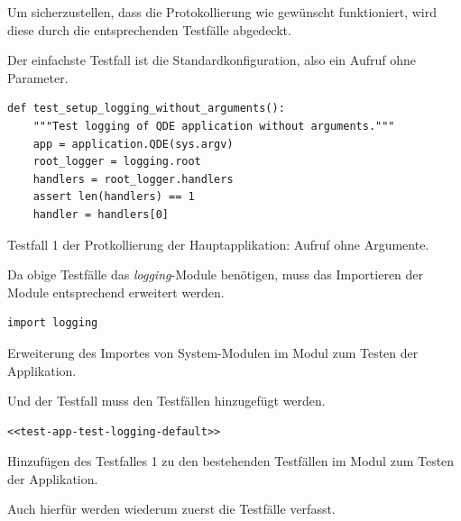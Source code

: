 \documentclass[10pt, openright, notitlepage]{scrreprt}
\begin{document}
Um sicherzustellen, dass die Protokollierung wie gewünscht funktioniert, wird
diese durch die entsprechenden Testfälle abgedeckt.

Der einfachste Testfall ist die Standardkonfiguration, also ein Aufruf ohne
Parameter.

\begin{listing}[H]
\begin{verbatim}
def test_setup_logging_without_arguments():
    """Test logging of QDE application without arguments."""
    app = application.QDE(sys.argv)
    root_logger = logging.root
    handlers = root_logger.handlers
    assert len(handlers) == 1
    handler = handlers[0]
\end{verbatim}
\caption{\label{test-app-test-logging-default}
Testfall 1 der Protkollierung der Hauptapplikation: Aufruf ohne Argumente.}
\end{listing}

Da obige Testfälle das \emph{logging}-Module benötigen, muss das Importieren der Module
entsprechend erweitert werden.

\begin{listing}[H]
\begin{verbatim}
import logging
\end{verbatim}
\caption{\label{test-app-system-imports}
Erweiterung des Importes von System-Modulen im Modul zum Testen der Applikation.}
\end{listing}

Und der Testfall muss den Testfällen hinzugefügt werden.

\begin{listing}[H]
\begin{verbatim}
<<test-app-test-logging-default>>
\end{verbatim}
\caption{\label{test-app-test-cases}
Hinzufügen des Testfalles 1 zu den bestehenden Testfällen im Modul zum Testen der Applikation.}
\end{listing}

Auch hierfür werden wiederum zuerst die Testfälle verfasst.
\end{document}
